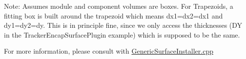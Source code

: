 Note\+: Assumes module and component volumes are boxes. For Trapezoids, a fitting box is built around the trapezoid which means dx1=dx2=dx1 and dy1=dy2=dy. This is in principle fine, since we only access the thicknesses (DY in the Tracker\+Encap\+Surface\+Plugin example) which is supposed to be the same.

For more information, please consult with \hyperlink{_generic_surface_installer_8cpp}{Generic\+Surface\+Installer.\+cpp} 